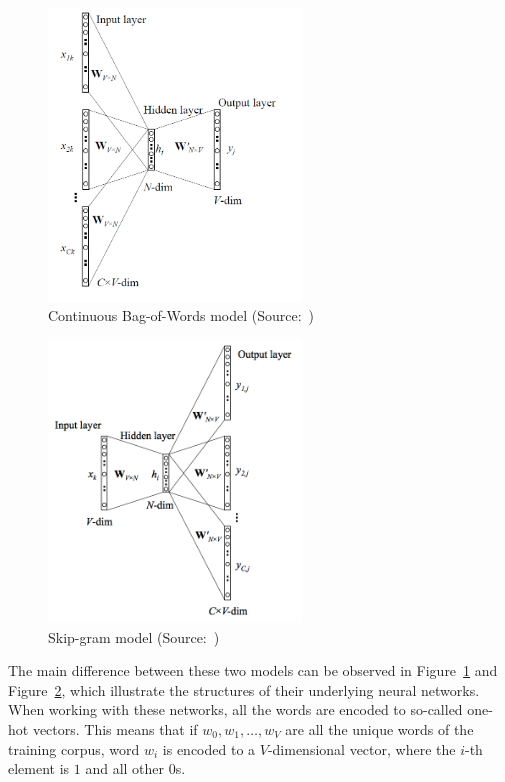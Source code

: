 \begin{figure}[!htb]
	\centering
	\caption{Continuous Bag-of-Words model (Source:~\cite{Rong14})}
	\label{figure:word2vec_cbow}
	\vspace{1em}
	\includegraphics[width=0.6\textwidth]{images/word2vec_cbow.png}
\end{figure}

\begin{figure}[!htb]
	\centering
	\caption{Skip-gram model (Source:~\cite{Rong14})}
	\label{figure:word2vec_sg}
	\vspace{1em}
	\includegraphics[width=0.6\textwidth]{images/word2vec_sg.png}
\end{figure}

The main difference between these two models can be observed in Figure~\ref{figure:word2vec_cbow} and Figure~\ref{figure:word2vec_sg}, which illustrate the structures of their underlying neural networks. When working with these networks, all the words are encoded to so-called one-hot vectors. This means that if $w_0, w_1, \ldots, w_V$ are all the unique words of the training corpus, word $w_i$ is encoded to a $V$-dimensional vector, where the $i$-th element is $1$ and all other $0$s.

